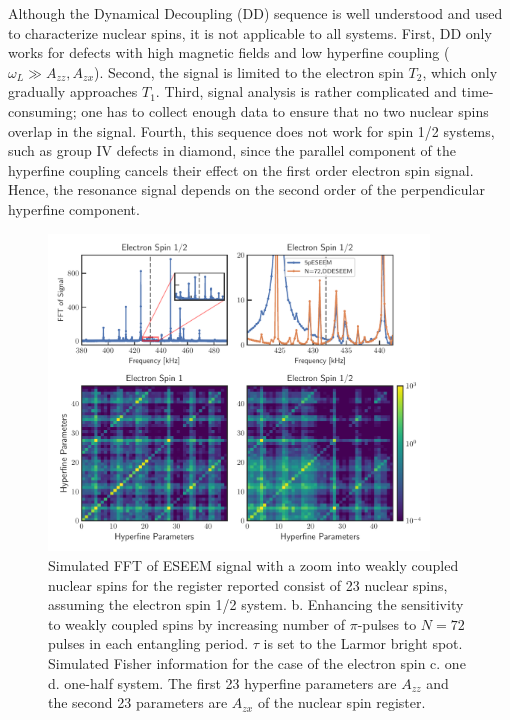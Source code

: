 \documentclass[%
 reprint,
superscriptaddress,
 amsmath,amssymb,
 aps,
]{revtex4-2}
\begin{document}
Although the Dynamical Decoupling (DD) sequence is well understood and used to characterize nuclear spins, it is not applicable to all systems.
First, DD only works for defects with high magnetic fields and low hyperfine coupling ($\omega_L \gg A_{zz}, A_{zx}$).
Second, the signal is limited to the electron spin $T_2$, which only gradually approaches $T_1$.
Third, signal analysis is rather complicated and time-consuming; one has to collect enough data to ensure that no two nuclear spins overlap in the signal.
Fourth, this sequence does not work for spin 1/2 systems, such as group IV defects in diamond, since the parallel component of the hyperfine coupling cancels their effect on the first order electron spin signal.
Hence, the resonance signal depends on the second order of the perpendicular hyperfine component.
\begin{figure}[htbp]
	\begin{center}
		\includegraphics[width=0.9\textwidth]{pict/eseem_compare2.pdf}
		\caption{Simulated FFT of ESEEM signal with a zoom into weakly coupled nuclear spins for the register reported \cite{abobeih2019atomic} consist of 23 nuclear spins, assuming the electron spin 1/2 system. b. Enhancing the sensitivity to weakly coupled spins by increasing number of $\pi$-pulses to $N=72$ pulses in each entangling period. $\tau$ is set to the Larmor bright spot. Simulated Fisher information for the case of the electron spin c. one d. one-half system. The first 23 hyperfine parameters are $A_{zz}$ and the second 23 parameters are $A_{zx}$ of the nuclear spin register.}
		\label{fig:ddeseem}
	\end{center}
\end{figure}
\end{document}
